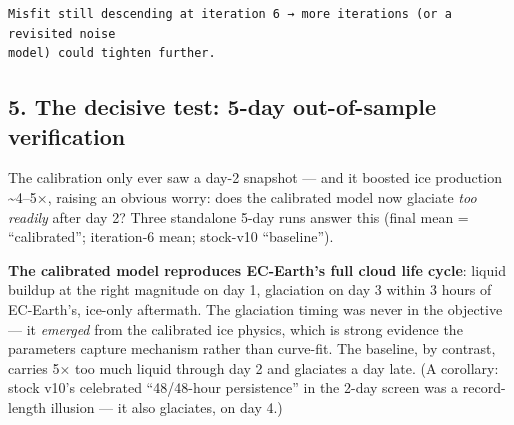 \documentclass[11pt]{article}
\begin{document}
    \begin{Verbatim}[commandchars=\\\{\}]
Misfit still descending at iteration 6 → more iterations (or a revisited noise
model) could tighten further.
    \end{Verbatim}

    \subsection{5. The decisive test: 5-day out-of-sample
verification}\label{the-decisive-test-5-day-out-of-sample-verification}

The calibration only ever saw a day-2 snapshot --- and it boosted ice
production \textasciitilde4--5×, raising an obvious worry: does the
calibrated model now glaciate \emph{too readily} after day 2? Three
standalone 5-day runs answer this (final mean = ``calibrated'';
iteration-6 mean; stock-v10 ``baseline'').

\textbf{The calibrated model reproduces EC-Earth's full cloud life
cycle}: liquid buildup at the right magnitude on day 1, glaciation on
day 3 within 3 hours of EC-Earth's, ice-only aftermath. The glaciation
timing was never in the objective --- it \emph{emerged} from the
calibrated ice physics, which is strong evidence the parameters capture
mechanism rather than curve-fit. The baseline, by contrast, carries 5×
too much liquid through day 2 and glaciates a day late. (A corollary:
stock v10's celebrated ``48/48-hour persistence'' in the 2-day screen
was a record-length illusion --- it also glaciates, on day 4.)
\end{document}
